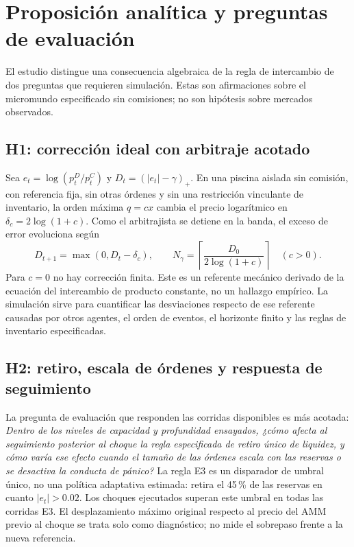 \chapter{Proposición analítica y preguntas de evaluación}
\label{cap:hipotesis}

El estudio distingue una consecuencia algebraica de la regla de intercambio de dos preguntas que requieren simulación. Estas son afirmaciones sobre el micromundo especificado sin comisiones; no son hipótesis sobre mercados observados.

\section{H1: corrección ideal con arbitraje acotado}

Sea $e_t=\log(p_t^D/p_t^C)$ y $D_t=(|e_t|-\gamma)_+$. En una piscina aislada sin comisión, con referencia fija, sin otras órdenes y sin una restricción vinculante de inventario, la orden máxima $q=cx$ cambia el precio logarítmico en $\delta_c=2\log(1+c)$. Como el arbitrajista se detiene en la banda, el exceso de error evoluciona según
\[
  D_{t+1}=\max(0,D_t-\delta_c),\qquad
  N_\gamma=\left\lceil\frac{D_0}{2\log(1+c)}\right\rceil \quad(c>0).
\]
Para $c=0$ no hay corrección finita. Este es un referente mecánico derivado de la ecuación del intercambio de producto constante, no un hallazgo empírico. La simulación sirve para cuantificar las desviaciones respecto de ese referente causadas por otros agentes, el orden de eventos, el horizonte finito y las reglas de inventario especificadas.

\section{H2: retiro, escala de órdenes y respuesta de seguimiento}

La pregunta de evaluación que responden las corridas disponibles es más acotada:
\emph{Dentro de los niveles de capacidad y profundidad ensayados, ¿cómo afecta al seguimiento posterior al choque la regla especificada de retiro único de liquidez, y cómo varía ese efecto cuando el tamaño de las órdenes escala con las reservas o se desactiva la conducta de pánico?}
La regla E3 es un disparador de umbral único, no una política adaptativa estimada: retira el 45\,\% de las reservas en cuanto $|e_t|>0.02$. Los choques ejecutados superan este umbral en todas las corridas E3. El desplazamiento máximo original respecto al precio del AMM previo al choque se trata solo como diagnóstico; no mide el sobrepaso frente a la nueva referencia.

